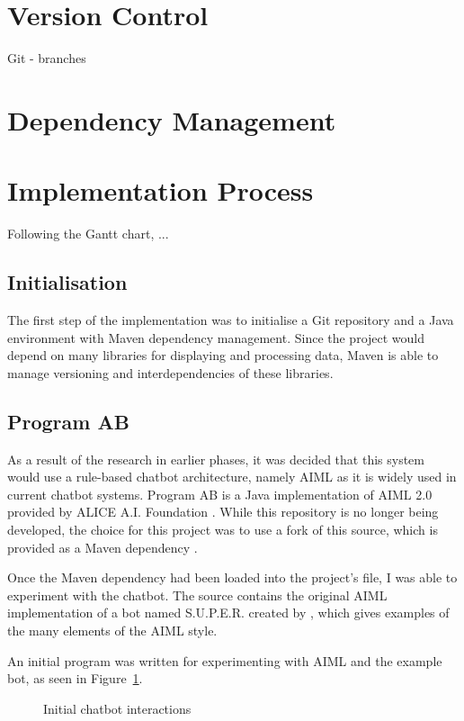 \newpage
\section{Version Control}
Git - branches

\section{Dependency Management}

\section{Implementation Process}
Following the Gantt chart, ...

\subsection{Initialisation}
The first step of the implementation was to initialise a Git repository and a Java environment with Maven dependency management. Since the project would depend on many libraries for displaying and processing data, Maven is able to manage versioning and interdependencies of these libraries.

\subsection{Program AB}
As a result of the research in earlier phases, it was decided that this system would use a rule-based chatbot architecture, namely AIML as it is widely used in current chatbot systems. Program AB is a Java implementation of AIML 2.0 provided by ALICE A.I. Foundation \cite{programab_2013}. While this repository is no longer being developed, the choice for this project was to use a fork of this source, which is provided as a Maven dependency \cite{lumenrobot2016}.

Once the Maven dependency had been loaded into the project's  file, I was able to experiment with the chatbot. The  source contains the original AIML implementation of a bot named S.U.P.E.R. created by \citet{wallace2009anatomy}, which gives examples of the many elements of the AIML style.

An initial program was written for experimenting with AIML and the example bot, as seen in Figure~\ref{fig:super}. 

\begin{figure}[ht]
	\centering
	\qquad
	\caption{Initial chatbot interactions}
	\label{fig:super}
\end{figure}

